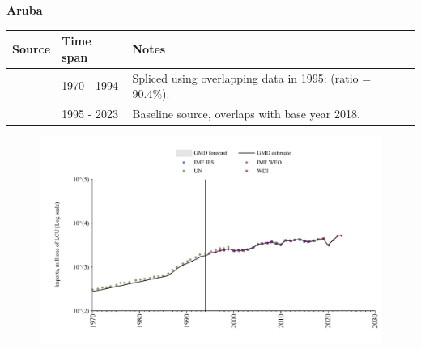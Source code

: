 \documentclass[12pt,a4paper,landscape]{article}
\begin{document}
\begin{adjustbox}{max totalsize={\paperwidth}{\paperheight},center}
\begin{minipage}[t][\textheight][t]{\textwidth}
\vspace*{0.5cm}
{}
\begin{center}
{\Large\bfseries Aruba}
\end{center}
\vspace{0.5cm}
\begin{table}[H]
\centering
\small
\begin{tabular}{|l|l|l|}
\hline
\textbf{Source} & \textbf{Time span} & \textbf{Notes} \\
\hline
\rowcolor{white}\cite{UN}& 1970 - 1994 &Spliced using overlapping data in 1995: (ratio = 90.4\%).\\
\rowcolor{lightgray}\cite{WDI}& 1995 - 2023 &Baseline source, overlaps with base year 2018.\\
\hline
\end{tabular}
\end{table}
\begin{figure}[H]
\centering
\includegraphics[width=\textwidth,height=0.6\textheight,keepaspectratio]{graphs/ABW_imports.pdf}
\end{figure}
\end{minipage}
\end{adjustbox}
\end{document}
